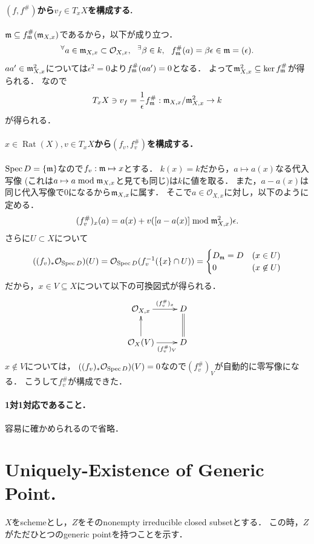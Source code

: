 \documentclass[a4paper]{jsarticle}
\newcommand{\shO}{\mathcal{O}}
\newcommand{\Rat}{\operatorname{Rat}} %
\begin{document}
    \paragraph{$(f,f^{\#})$から$v_f \in T_x X$を構成する.}
    $\mathfrak{m} \subseteq f^{\#}_{\mathfrak{m}}(\mathfrak{m}_{X,x})$であるから，以下が成り立つ．
    \[
        \Forall{a \in \I{m}_{X,x} \subset \shO_{X,x}} \Exists{\beta \in k}
        f_{\I{m}}^{\#}(a)=\beta \epsilon \in \I{m}=(\epsilon).
    \]
    $aa' \in \mathfrak{m}_{X,x}^2$については$\epsilon^2=0$より$f_{\mathfrak{m}}^{\#}(aa')=0$となる．
    よって$\mathfrak{m}_{X,x}^2 \subseteq \ker f_{\mathfrak{m}}^{\#}$が得られる．
    なので
    \[ T_x X \ni v_f=\frac{1}{\epsilon}f_{\mathfrak{m}}^{\#}: \mathfrak{m}_{X,x}/\mathfrak{m}_{X,x}^2 \to k \]
    が得られる．

    \paragraph{$x \in \Rat(X), v \in T_x X$から$(f_v,f_v^{\#})$を構成する．}
    $\operatorname{Spec} D=\{\mathfrak{m}\}$なので$f_v: \mathfrak{m} \mapsto x$とする．
    $k(x)=k$だから，$a \mapsto a(x)$なる代入写像
    (これは$a \mapsto a \bmod \mathfrak{m}_{X,x}$と見ても同じ)は$k$に値を取る．
    また，$a-a(x)$は同じ代入写像で0になるから$\mathfrak{m}_{X,x}$に属す．
    そこで$a \in \shO_{X,x}$に対し，以下のように定める．
    \[ (f_v^{\#})_x(a)=a(x)+v([a-a(x)] \bmod \mathfrak{m}_{X,x}^2)\epsilon. \]
    さらに$U \subset X$について
    \[
        ((f_v)_* \shO_{\Spec D})(U)
        =\shO_{\Spec D}(f_v^{-1}(\{x\} \cap U))
        =
        \begin{cases}{}
            D_{\I{m}}=D & (x \in U) \\
            0   & (x \not \in U)
        \end{cases}
    \]
    だから，$x \in V \subseteq X$について以下の可換図式が得られる．
    \[
    \xymatrix
    {
    \shO_{X,x} \ar[r]^-{(f_v^{\#})_x} & D \\
    \shO_{X}(V) \ar[r]_-{(f_v^{\#})_V} \ar[u]& D \ar@{=}[u]
    }
    \]
    $x \not \in V$については，
    $((f_v)_* \shO_{\Spec D})(V)=0$なので$(f_v^{\#})_V$が自動的に零写像になる．
    こうして$f_v^{\#}$が構成できた．

    \paragraph{1対1対応であること．}
    容易に確かめられるので省略．

\section{Uniquely-Existence of Generic Point.} %
    $X$をschemeとし，$Z$をそのnonempty irreducible closed subsetとする．
    この時，$Z$がただひとつのgeneric pointを持つことを示す．
\end{document}
